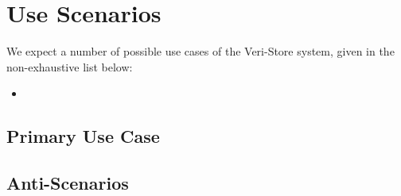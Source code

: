 \documentclass[../veristore_security_model.tex]{subfiles}
\begin{document}
\section{Use Scenarios}


We expect a number of possible use cases of the Veri-Store system, given in the non-exhaustive list below:
\begin{itemize}
    \item
\end{itemize}

\subsection{Primary Use Case}


\subsection{Anti-Scenarios}


\newpage
\end{document}
